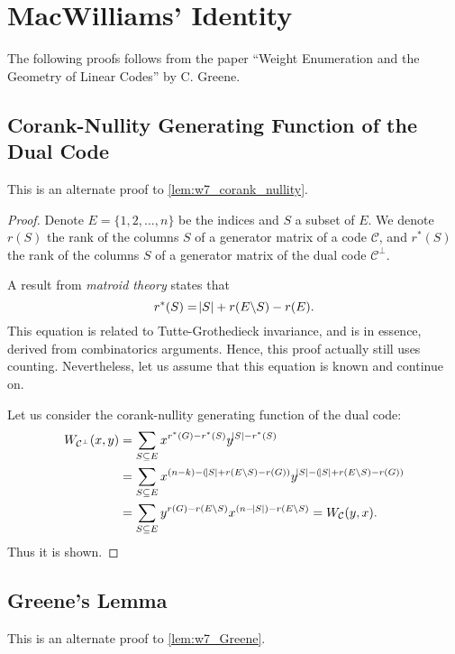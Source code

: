 \section{MacWilliams' Identity}

The following proofs follows from the paper ``Weight Enumeration and the Geometry of Linear Codes'' \cite{Greene} by C. Greene.

\subsection{Corank-Nullity Generating Function of the Dual Code} \label{app:Whitney}
This is an alternate proof to \autoref{lem:w7_corank_nullity}.

\begin{proof}
    Denote $E=\{1,2,\ldots,n\}$ be the indices and $S$ a subset of $E$. We denote $r(S)$ the rank of the columns $S$ of a generator matrix of a code $\mathcal{C}$, and $r^*(S)$ the rank of the columns $S$ of a generator matrix of the dual code $\mathcal{C}^\perp$.

    A result from \textit{matroid theory} states that
    \begin{equation}
        r^*(S) = \abs{S} + r(E\backslash S) - r(E).
    \end{equation}
    This equation is related to Tutte-Grothedieck invariance, and is in essence, derived from combinatorics arguments. Hence, this proof actually still uses counting. Nevertheless, let us assume that this equation is known and continue on.

    Let us consider the corank-nullity generating function of the dual code:
    \begin{align*}
        W_{\mathcal{C}^\perp}(x,y) &= \sum_{S\subseteq E} x^{r^*(G) - r^*(S)} y^{\abs{S} - r^*(S)} \\
        &= \sum_{S\subseteq E} x^{(n-k) - (\abs{S} + r(E\backslash S) - r(G))} y^{\abs{S} - (\abs{S} + r(E\backslash S) - r(G))} \\
        &= \sum_{S\subseteq E} y^{r(G) - r(E\backslash S)} x^{(n-\abs{S}) - r(E\backslash S)} = W_\mathcal{C}(y,x).
    \end{align*}
    Thus it is shown.
\end{proof}


\subsection{Greene's Lemma} \label{app:Greene}
This is an alternate proof to \autoref{lem:w7_Greene}.

